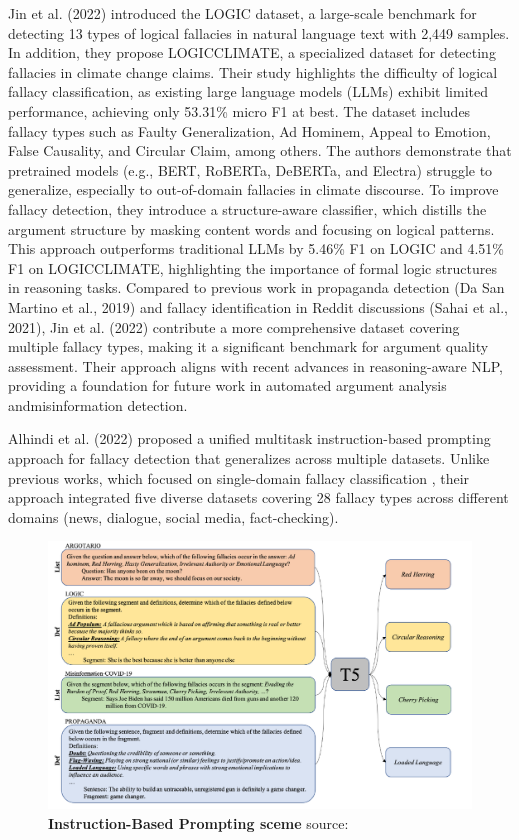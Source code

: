 Jin et al. (2022) \cite{jinLogicalFallacyDetection2022} introduced the LOGIC dataset, a large-scale benchmark for detecting 13 types of logical fallacies in natural language text with 2,449 samples. In addition, they propose LOGICCLIMATE, a specialized dataset for detecting fallacies in climate change claims. Their study highlights the difficulty of logical fallacy classification, as existing large language models (LLMs) exhibit limited performance, achieving only 53.31\% micro F1 at best.
The dataset includes fallacy types such as Faulty Generalization, Ad Hominem, Appeal to Emotion, False Causality, and Circular Claim, among others. The authors demonstrate that pretrained models (e.g., BERT, RoBERTa, DeBERTa, and Electra) struggle to generalize, especially to out-of-domain fallacies in climate discourse. To improve fallacy detection, they introduce a structure-aware classifier, which distills the argument structure by masking content words and focusing on logical patterns. This approach outperforms traditional LLMs by 5.46\% F1 on LOGIC and 4.51\% F1 on LOGICCLIMATE, highlighting the importance of formal logic structures in reasoning tasks.
Compared to previous work in propaganda detection (Da San Martino et al., 2019) and fallacy identification in Reddit discussions (Sahai et al., 2021), Jin et al. (2022) contribute a more comprehensive dataset covering multiple fallacy types, making it a significant benchmark for argument quality assessment. Their approach aligns with recent advances in reasoning-aware NLP, providing a foundation for future work in automated argument analysis andmisinformation detection.
\par
Alhindi et al. (2022) \cite{alhindiMultitaskInstructionbasedPrompting2022} proposed a unified multitask instruction-based prompting approach for fallacy detection that generalizes across multiple datasets. Unlike previous works, which focused on single-domain fallacy classification \cite{sahaiBreakingInvisibleWall2021} \cite{jinLogicalFallacyDetection2022}, their approach integrated five diverse datasets covering 28 fallacy types across different domains (news, dialogue, social media, fact-checking).
\begin{figure}[H]
\centering
\includegraphics[width=\textwidth]{graphics/Alhindi.png}
\caption{\textbf{Instruction-Based Prompting sceme} source: \cite{alhindiMultitaskInstructionbasedPrompting2022}}
\end{figure}
